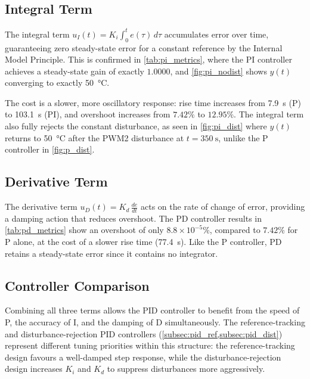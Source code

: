 \subsection{Integral Term}

The integral term $u_I(t) = K_i\int_0^t e(\tau)\,d\tau$ accumulates error over time, guaranteeing zero steady-state error for a constant reference by the Internal Model Principle.
This is confirmed in \cref{tab:pi_metrics}, where the PI controller achieves a steady-state gain of exactly $1.0000$, and \cref{fig:pi_nodist} shows $y(t)$ converging to exactly \SI{50}{\degreeCelsius}.

The cost is a slower, more oscillatory response: rise time increases from \SI{7.9}{\second} (P) to \SI{103.1}{\second} (PI), and overshoot increases from $7.42\%$ to $12.95\%$.
The integral term also fully rejects the constant disturbance, as seen in \cref{fig:pi_dist} where $y(t)$ returns to \SI{50}{\degreeCelsius} after the PWM2 disturbance at $t = \SI{350}{\second}$, unlike the P controller in \cref{fig:p_dist}.

\subsection{Derivative Term}

The derivative term $u_D(t) = K_d\,\frac{de}{dt}$ acts on the rate of change of error, providing a damping action that reduces overshoot.
The PD controller results in \cref{tab:pd_metrics} show an overshoot of only $8.8 \times 10^{-5}\%$, compared to $7.42\%$ for P alone, at the cost of a slower rise time (\SI{77.4}{\second}).
Like the P controller, PD retains a steady-state error since it contains no integrator.

\subsection{Controller Comparison}

Combining all three terms allows the PID controller to benefit from the speed of P, the accuracy of I, and the damping of D simultaneously.
The reference-tracking and disturbance-rejection PID controllers (\cref{subsec:pid_ref,subsec:pid_dist}) represent different tuning priorities within this structure: the reference-tracking design favours a well-damped step response, while the disturbance-rejection design increases $K_i$ and $K_d$ to suppress disturbances more aggressively.
